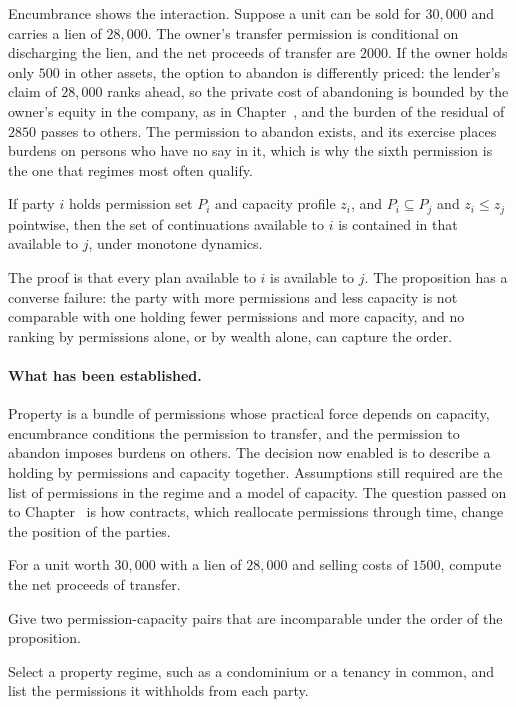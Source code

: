 Encumbrance shows the interaction. Suppose a unit can be sold for $30{,}000$ and carries a lien of $28{,}000$. The owner's transfer permission is conditional on discharging the lien, and the net proceeds of transfer are $2000$. If the owner holds only $500$ in other assets, the option to abandon is differently priced: the lender's claim of $28{,}000$ ranks ahead, so the private cost of abandoning is bounded by the owner's equity in the company, as in Chapter~, and the burden of the residual of $2850$ passes to others. The permission to abandon exists, and its exercise places burdens on persons who have no say in it, which is why the sixth permission is the one that regimes most often qualify.

\begin{proposition}\label{prop:eff-authority}
If party $i$ holds permission set $P_i$ and capacity profile $z_i$, and $P_i\subseteq P_j$ and $z_i\le z_j$ pointwise, then the set of continuations available to $i$ is contained in that available to $j$, under monotone dynamics.
\end{proposition}

The proof is that every plan available to $i$ is available to $j$. The proposition has a converse failure: the party with more permissions and less capacity is not comparable with one holding fewer permissions and more capacity, and no ranking by permissions alone, or by wealth alone, can capture the order.

\paragraph{What has been established.} Property is a bundle of permissions whose practical force depends on capacity, encumbrance conditions the permission to transfer, and the permission to abandon imposes burdens on others. The decision now enabled is to describe a holding by permissions and capacity together. Assumptions still required are the list of permissions in the regime and a model of capacity. The question passed on to Chapter~ is how contracts, which reallocate permissions through time, change the position of the parties.

\begin{exercise}
For a unit worth $30{,}000$ with a lien of $28{,}000$ and selling costs of $1500$, compute the net proceeds of transfer.
\end{exercise}
\begin{exercise}
Give two permission-capacity pairs that are incomparable under the order of the proposition.
\end{exercise}
\begin{exercise}
Select a property regime, such as a condominium or a tenancy in common, and list the permissions it withholds from each party.
\end{exercise}

